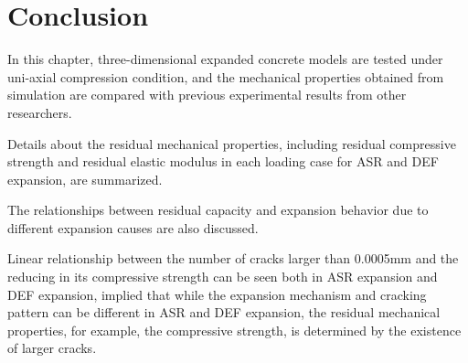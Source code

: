 \section{Conclusion}

In this chapter, three-dimensional expanded concrete models are tested under uni-axial compression condition, and the mechanical properties obtained from simulation are compared with previous experimental results from other researchers.

Details about the residual mechanical properties, including residual compressive strength and residual elastic modulus in each loading case for ASR and DEF expansion, are summarized.

The relationships between residual capacity and expansion behavior due to different expansion causes are also discussed.

Linear relationship between the number of cracks larger than 0.0005mm and the reducing in its compressive strength can be seen both in ASR expansion and DEF expansion, implied that while the expansion mechanism and cracking pattern can be different in ASR and DEF expansion, the residual mechanical properties, for example, the compressive strength, is determined by the existence of larger cracks.
